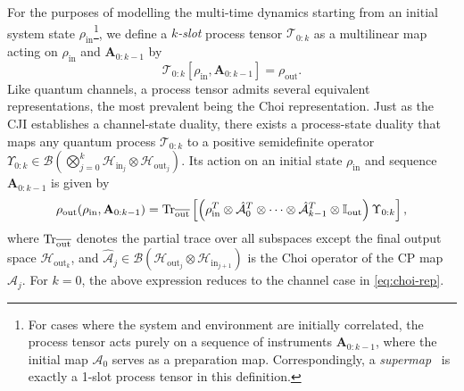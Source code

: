 For the purposes of modelling the multi-time dynamics starting from an initial system state \(\rho_\mathrm{in}\)\footnote{For cases where the system and environment are initially correlated, the process tensor acts purely on a sequence of instruments \(\mathbf{A}_{0:k-1}\), where the initial map \(\mathcal{A}_0\) serves as a preparation map. Correspondingly, a \emph{supermap}~\cite{chiribellaQuantumCircuitArchitecture2008} is exactly a 1-slot process tensor in this definition.}, we define a \emph{\(k\)-slot} process tensor \(\mathcal{T}_{0:k}\) as a multilinear map acting on \(\rho_\mathrm{in}\) and \(\mathbf{A}_{0:k-1}\) by
\begin{equation}
\mathcal{T}_{0:k}[\rho_\mathrm{in},\mathbf{A}_{0:k-1}] = \rho_\mathrm{out}.
\end{equation}
Like quantum channels, a process tensor admits several equivalent representations, the most prevalent being the Choi representation. Just as the CJI establishes a channel-state duality, there exists a process-state duality that maps any quantum process \(\mathcal{T}_{0:k}\) to a positive semidefinite operator \(\Upsilon_{0:k} \in \mathcal{B}(\bigotimes_{j=0}^k \mathcal{H}_{\mathrm{in}_j} \otimes \mathcal{H}_{\mathrm{out}_j})\). Its action on an initial state \(\rho_{\mathrm{in}}\) and sequence \(\mathbf{A}_{0:k-1}\) is given by
\begin{equation}\label{eq:pt-choi-rep}
    \rho_\mathrm{out}(\rho_\mathrm{in}, \mathbf{A}_{0:k-1}) = \mathrm{Tr}_{\overline{\mathrm{out}}} \left[\left(\rho_{\mathrm{in}}^T\otimes \hat{\mathcal{A}}_0^T\otimes \cdots \otimes\hat{\mathcal{A}}_{k-1}^T \otimes \mathbb{I}_{\mathrm{out}}\right)\Upsilon_{0:k}\right],
\end{equation}
where \(\mathrm{Tr}_{\overline{\mathrm{out}}}\) denotes the partial trace over all subspaces except the final output space \(\mathcal{H}_{\mathrm{out}_k}\), and \(\hat{\mathcal{A}}_j \in \mathcal{B}(\mathcal{H}_{\mathrm{out}_j} \otimes \mathcal{H}_{\mathrm{in}_{j+1}})\) is the Choi operator of the CP map \(\mathcal{A}_j\). For \(k=0\), the above expression reduces to the channel case in \cref{eq:choi-rep}.

